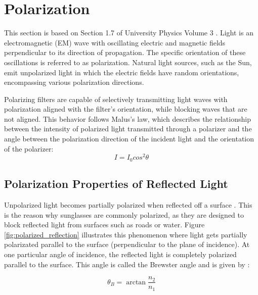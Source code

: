 \section{Polarization}
This section is based on Section 1.7 of University Physics Volume 3 \cite[30-33]{lingUniversityPhysicsVolume2016}.
Light is an electromagnetic (EM) wave with oscillating electric and magnetic fields perpendicular to its direction of propagation.
The specific orientation of these oscillations is referred to as polarization.
Natural light sources, such as the Sun, emit unpolarized light in which the electric fields have random orientations, encompassing various polarization directions.

Polarizing filters are capable of selectively transmitting light waves with polarization aligned with the filter's orientation, while blocking waves that are not aligned.
This behavior follows Malus's law, which describes the relationship between the intensity of polarized light transmitted through a polarizer and the angle between the polarization direction of the incident light and the orientation of the polarizer:
\begin{equation}
    I = I_0 cos^2 \theta
\end{equation}

\subsection{Polarization Properties of Reflected Light}
Unpolarized light becomes partially polarized when reflected off a surface \cite[34]{lingUniversityPhysicsVolume2016}.
This is the reason why sunglasses are commonly polarized, as they are designed to block reflected light from surfaces such as roads or water.
Figure \ref{fig:polarized_reflection} illustrates this phenomenon where light gets partially polarizated parallel to the surface (perpendicular to the plane of incidence).
At one particular angle of incidence, the reflected light is completely polarized parallel to the surface.
This angle is called the Brewster angle and is given by \cite{BrewsterAngle2023}:

\begin{equation}
    \theta_B = \arctan{\frac{n_2}{n_1}}
\end{equation}

